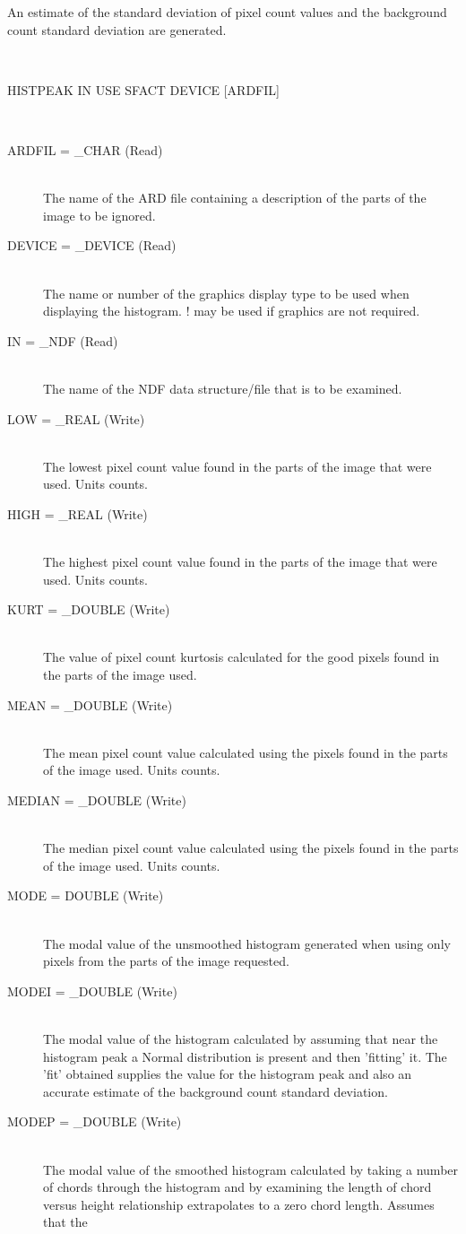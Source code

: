 \documentclass[twoside,11pt]{article}
\newcommand{\sstusage}[1]{\item[Usage:] \mbox{}
\\[1.3ex]{\raggedright \ssttt #1}}
\newcommand{\sstparameters}[1]{
   \item[Parameters:] \mbox{} \\
   \vspace{-3.5ex}
   \begin{description}
      #1
   \end{description}
}
\newcommand{\sstsubsection}[1]{ \item[{#1}] \mbox{} \\}
\newcommand{\sstusage}[1]{\item[Usage:]
      \begin{description}
         {\ssttt #1}
      \end{description}
      \\
   }
\newcommand{\sstparameters}[1]{
      \item[Parameters:] \\
      \begin{description}
         #1
      \end{description}
      \\
   }
\newcommand{\sstsubsection}[1]{\item[{#1}]}
\begin{document}
{{{      }
      An estimate of the standard deviation of pixel count values
      and the background count standard deviation are generated.
   }
   \sstusage{
      HISTPEAK IN USE SFACT DEVICE [ARDFIL]
   }
   \sstparameters{
      \sstsubsection{
         ARDFIL = \_CHAR (Read)
      }{
         The name of the ARD file containing a description of
         the parts of the image to be ignored.
      }
      \sstsubsection{
         DEVICE = \_DEVICE (Read)
      }{
         The name or number of the graphics display type to be
         used when displaying the histogram. ! may be used if
         graphics are not required.
      }
      \sstsubsection{
         IN = \_NDF (Read)
      }{
         The name of the NDF data structure/file that is to be
         examined.
      }
      \sstsubsection{
         LOW = \_REAL (Write)
      }{
         The lowest pixel count value found in the parts of the
         image that were used. Units counts.
      }
      \sstsubsection{
         HIGH = \_REAL (Write)
      }{
         The highest pixel count value found in the parts of the
         image that were used. Units counts.
      }
      \sstsubsection{
         KURT = \_DOUBLE (Write)
      }{
         The value of pixel count kurtosis calculated for the good
         pixels found in the parts of the image used.
      }
      \sstsubsection{
         MEAN = \_DOUBLE (Write)
      }{
         The mean pixel count value calculated using the pixels found
         in the parts of the image used. Units counts.
      }
      \sstsubsection{
         MEDIAN = \_DOUBLE (Write)
      }{
         The median pixel count value calculated using the pixels
         found in the parts of the image used. Units counts.
      }
      \sstsubsection{
         MODE = DOUBLE (Write)
      }{
         The modal value of the unsmoothed histogram generated
         when using only pixels from the parts of the image requested.
      }
      \sstsubsection{
         MODEI = \_DOUBLE (Write)
      }{
         The modal value of the histogram calculated by
         assuming that near the histogram peak a Normal distribution
         is present and then 'fitting' it. The 'fit' obtained
         supplies the value for the histogram peak and also an
         accurate estimate of the background count standard deviation.
      }
      \sstsubsection{
         MODEP = \_DOUBLE (Write)
      }{
         The modal value of the smoothed histogram calculated
         by taking a number of chords through the histogram and
         by examining the length of chord versus height relationship
         extrapolates to a zero chord length. Assumes that the
}}}
\end{document}
